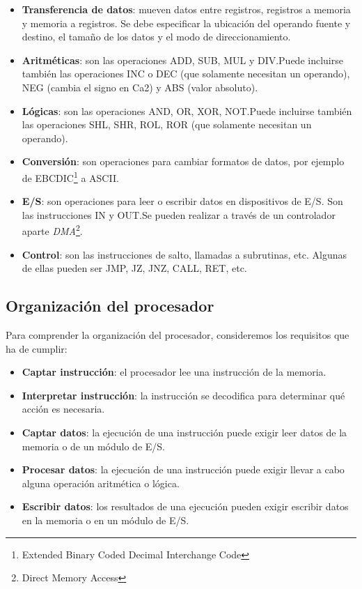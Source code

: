 \begin{itemize}
  \item \textbf{Transferencia de datos}: mueven datos entre registros, registros a memoria y memoria a registros. Se debe especificar la ubicación del operando fuente y destino, el tamaño de los datos y el modo de direccionamiento.
  \item \textbf{Aritméticas}: son las operaciones ADD, SUB, MUL y DIV.\@ Puede incluirse también las operaciones INC o DEC (que solamente necesitan un operando), NEG (cambia el signo en Ca2) y ABS (valor absoluto).
  \item \textbf{Lógicas}: son las operaciones AND, OR, XOR, NOT.\@ Puede incluirse también las operaciones SHL, SHR, ROL, ROR (que solamente necesitan un operando).
  \item \textbf{Conversión}: son operaciones para cambiar formatos de datos, por ejemplo de EBCDIC\footnote{Extended Binary Coded Decimal Interchange Code} a ASCII.\@
  \item \textbf{E/S}: son operaciones para leer o escribir datos en dispositivos de E/S. Son las instrucciones IN y OUT.\@ Se pueden realizar a través de un controlador aparte \textit{DMA}\footnote{Direct Memory Access}.
  \item \textbf{Control}: son las instrucciones de salto, llamadas a subrutinas, etc. Algunas de ellas pueden ser JMP, JZ, JNZ, CALL, RET, etc.
\end{itemize}

\subsection{Organización del procesador}

Para comprender la organización del procesador, consideremos los requisitos que ha de cumplir:

\begin{itemize}
  \item \textbf{Captar instrucción}: el procesador lee una instrucción de la memoria.
  \item \textbf{Interpretar instrucción}: la instrucción se decodifica para determinar qué acción es necesaria.
  \item \textbf{Captar datos}: la ejecución de una instrucción puede exigir leer datos de la memoria o de un módulo de E/S.
  \item \textbf{Procesar datos}: la ejecución de una instrucción puede exigir llevar a cabo alguna operación aritmética o lógica.
  \item \textbf{Escribir datos}: los resultados de una ejecución pueden exigir escribir datos en la memoria o en un módulo de E/S.
\end{itemize}

